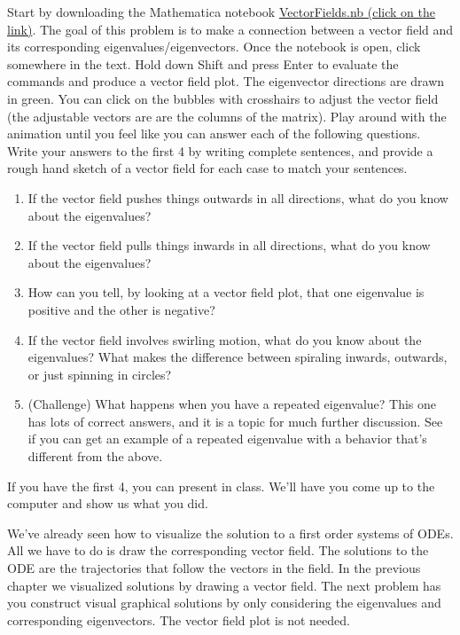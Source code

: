 \begin{problem}
Start by downloading the Mathematica notebook \href{https://www.dropbox.com/s/1df1nswgbq3y34n/316-VectorField.nb}{VectorFields.nb (click on the link)}.  The goal of this problem is to make a connection between a vector field and its corresponding eigenvalues/eigenvectors. Once the notebook is open, click somewhere in the text. Hold down Shift and press Enter to evaluate the commands and produce a vector field plot. The eigenvector directions are drawn in green. You can click on the bubbles with crosshairs to adjust the vector field (the adjustable vectors are are the columns of the matrix). Play around with the animation until you feel like you can answer each of the following questions. Write your answers to the first 4 by writing complete sentences, and provide a rough hand sketch of a vector field for each case to match your sentences. 
 \begin{enumerate}
  \item If the vector field pushes things outwards in all directions, what do you know about the eigenvalues?
  \item If the vector field pulls things inwards in all directions, what do you know about the eigenvalues?
  \item How can you tell, by looking at a vector field plot, that one eigenvalue is positive and the other is negative?
  \item If the vector field involves swirling motion, what do you know about the eigenvalues? What makes the difference between spiraling inwards, outwards, or just spinning in circles?
  \item (Challenge) What happens when you have a repeated eigenvalue? This one has lots of correct answers, and it is a topic for much further discussion. See if you can get an example of a repeated eigenvalue with a behavior that's different from the above. 
 \end{enumerate}
If you have the first 4, you can present in class. We'll have you come up to the computer and show us what you did.
\end{problem}



We've already seen how to visualize the solution to a first order systems of ODEs.  All we have to do is draw the corresponding vector field.  The solutions to the ODE are the trajectories that follow the vectors in the field.  In the previous chapter we visualized solutions by drawing a vector field. The next problem has you construct visual graphical solutions by only considering the eigenvalues and corresponding eigenvectors.  The vector field plot is not needed. 

